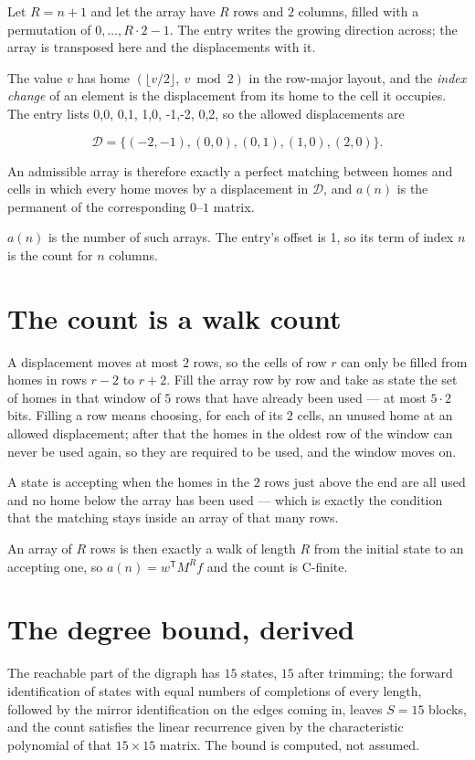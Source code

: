 \documentclass[11pt]{article}
\theoremstyle{definition}
\begin{document}
Let $R = n + 1$ and let the array have $R$ rows and $2$ columns, filled with a permutation of $0,\dots,R\cdot2-1$. The entry writes the growing direction across; the array is transposed here and the displacements with it.

The value $v$ has home $(\lfloor v/2\rfloor,\ v \bmod 2)$ in the row-major layout, and the {\itshape index change} of an element is the displacement from its home to the cell it occupies. The entry lists 0,0, 0,1, 1,0, -1,-2, 0,2, so the allowed displacements are

\[\mathcal{D} = \{(-2,-1), (0,0), (0,1), (1,0), (2,0)\}.\]

An admissible array is therefore exactly a perfect matching between homes and cells in which every home moves by a displacement in $\mathcal{D}$, and $a(n)$ is the permanent of the corresponding $0$--$1$ matrix.

$a(n)$ is the number of such arrays. The entry's offset is 1, so its term of index $n$ is the count for $n$ columns.

\section{The count is a walk count}

A displacement moves at most $2$ rows, so the cells of row $r$ can only be filled from homes in rows $r-2$ to $r+2$. Fill the array row by row and take as state the set of homes in that window of $5$ rows that have already been used --- at most $5\cdot2$ bits. Filling a row means choosing, for each of its $2$ cells, an unused home at an allowed displacement; after that the homes in the oldest row of the window can never be used again, so they are required to be used, and the window moves on.

A state is accepting when the homes in the $2$ rows just above the end are all used and no home below the array has been used --- which is exactly the condition that the matching stays inside an array of that many rows.

An array of $R$ rows is then exactly a walk of length $R$ from the initial state to an accepting one, so $a(n) = w^{\mathsf T}M^{R}f$ and the count is C-finite.

\section{The degree bound, derived}

The reachable part of the digraph has $15$ states, $15$ after trimming; the forward identification of states with equal numbers of completions of every length, followed by the mirror identification on the edges coming in, leaves $S = 15$ blocks, and the count satisfies the linear recurrence given by the characteristic polynomial of that $15\times15$ matrix. The bound is computed, not assumed.
\end{document}
